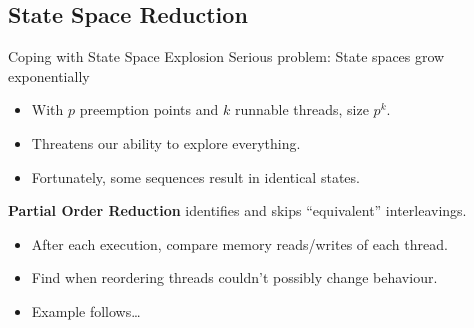 \documentclass[xcolor=dvipsnames]{beamer}
\begin{document}
%

\subsection{State Space Reduction}

\begin{frame}{Coping with State Space Explosion}
	Serious problem: State spaces grow exponentially
	\begin{itemize}
		\item With $p$ preemption points and $k$ runnable threads, size $p^k$.
		\item Threatens our ability to explore everything.
		\item Fortunately, some sequences result in identical states.
	\end{itemize}
	\linegap

	{\bf Partial Order Reduction} identifies and skips ``equivalent'' interleavings.
	\begin{itemize}
		\item After each execution, compare memory reads/writes of each thread.
		\item Find when reordering threads couldn't possibly change behaviour.
		\item Example follows\dots
	\end{itemize}
\end{frame}
\end{document}
